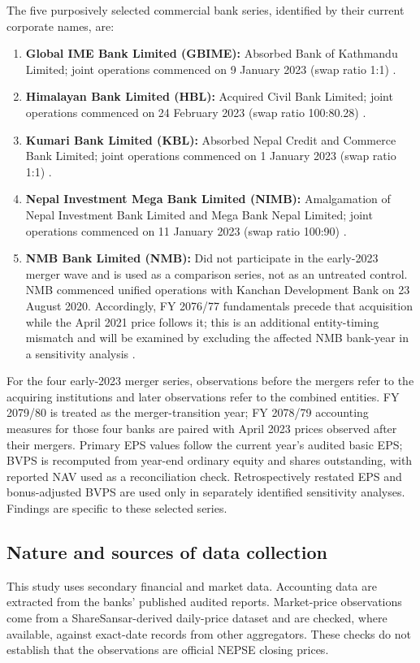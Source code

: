 The five purposively selected commercial bank series, identified by their current corporate names, are:
\begin{enumerate}
  \item \textbf{Global IME Bank Limited (GBIME):} Absorbed Bank of Kathmandu Limited; joint operations commenced on 9 January 2023 (swap ratio 1:1) \citep{gbime2022agm,nrb2023list}.
  \item \textbf{Himalayan Bank Limited (HBL):} Acquired Civil Bank Limited; joint operations commenced on 24 February 2023 (swap ratio 100:80.28) \citep{hbl2023report}.
  \item \textbf{Kumari Bank Limited (KBL):} Absorbed Nepal Credit and Commerce Bank Limited; joint operations commenced on 1 January 2023 (swap ratio 1:1) \citep{kumari2022sgm,nrb2023list}.
  \item \textbf{Nepal Investment Mega Bank Limited (NIMB):} Amalgamation of Nepal Investment Bank Limited and Mega Bank Nepal Limited; joint operations commenced on 11 January 2023 (swap ratio 100:90) \citep{nimb2023report}.
  \item \textbf{NMB Bank Limited (NMB):} Did not participate in the early-2023 merger wave and is used as a comparison series, not as an untreated control. NMB commenced unified operations with Kanchan Development Bank on 23 August 2020. Accordingly, FY 2076/77 fundamentals precede that acquisition while the April 2021 price follows it; this is an additional entity-timing mismatch and will be examined by excluding the affected NMB bank-year in a sensitivity analysis \citep{nmb2021report}.
\end{enumerate}

For the four early-2023 merger series, observations before the mergers refer to the acquiring institutions and later observations refer to the combined entities. FY 2079/80 is treated as the merger-transition year; FY 2078/79 accounting measures for those four banks are paired with April 2023 prices observed after their mergers. Primary EPS values follow the current year's audited basic EPS; BVPS is recomputed from year-end ordinary equity and shares outstanding, with reported NAV used as a reconciliation check. Retrospectively restated EPS and bonus-adjusted BVPS are used only in separately identified sensitivity analyses. Findings are specific to these selected series.

\subsection{Nature and sources of data collection}
This study uses secondary financial and market data. Accounting data are
extracted from the banks' published audited reports. Market-price observations
come from a ShareSansar-derived daily-price dataset and are checked, where
available, against exact-date records from other aggregators. These checks do
not establish that the observations are official NEPSE closing prices.

